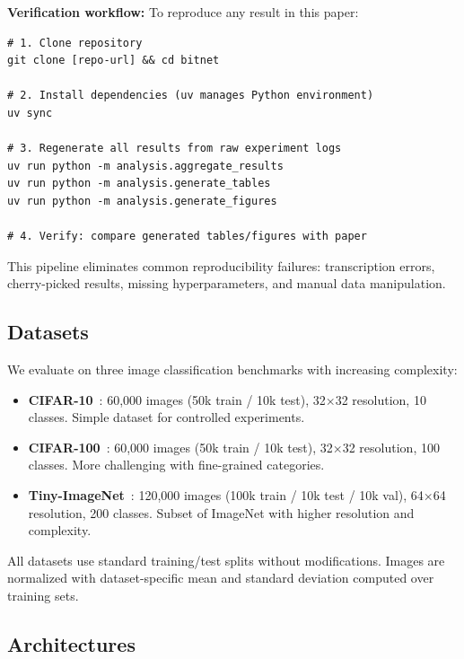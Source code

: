 \textbf{Verification workflow:} To reproduce any result in this paper:
\begin{verbatim}
# 1. Clone repository
git clone [repo-url] && cd bitnet

# 2. Install dependencies (uv manages Python environment)
uv sync

# 3. Regenerate all results from raw experiment logs
uv run python -m analysis.aggregate_results
uv run python -m analysis.generate_tables
uv run python -m analysis.generate_figures

# 4. Verify: compare generated tables/figures with paper
\end{verbatim}

This pipeline eliminates common reproducibility failures: transcription errors, cherry-picked results, missing hyperparameters, and manual data manipulation.

\subsection{Datasets}
\label{sec:methods:datasets}

We evaluate on three image classification benchmarks with increasing complexity:

\begin{itemize}
    \item \textbf{CIFAR-10}~\cite{krizhevsky2009cifar}: 60,000 images (50k train / 10k test), 32×32 resolution, 10 classes. Simple dataset for controlled experiments.

    \item \textbf{CIFAR-100}~\cite{krizhevsky2009cifar}: 60,000 images (50k train / 10k test), 32×32 resolution, 100 classes. More challenging with fine-grained categories.

    \item \textbf{Tiny-ImageNet}~\cite{le2015tinyimagenet}: 120,000 images (100k train / 10k test / 10k val), 64×64 resolution, 200 classes. Subset of ImageNet with higher resolution and complexity.
\end{itemize}

All datasets use standard training/test splits without modifications. Images are normalized with dataset-specific mean and standard deviation computed over training sets.

\subsection{Architectures}
\label{sec:methods:architectures}

